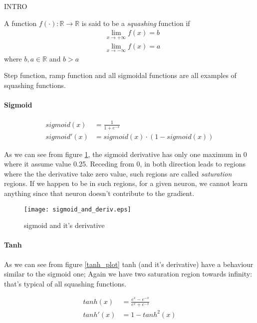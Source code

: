 INTRO

\begin{defn}
A function $f(\cdot):\mathbb{R}\rightarrow\mathbb{R}$ is said to be a \textit{squashing} function if
\begin{align}
&\lim_{x \to +\infty} f(x) = b \\
& \lim_{x \to -\infty} f(x) = a 
\end{align}
where $b,a \in \mathbb{R}$ and $b>a$
\end{defn}

Step function, ramp function and all sigmoidal functions are all examples of squashing functions.

\paragraph{Sigmoid}

\begin{align}
sigmoid(x)&= \frac{1}{1+e^{-x}}  \\ 
sigmoid'(x)&= sigmoid(x) \cdot (1-sigmoid(x))
\end{align}

As we can see from figure \ref{sigmoid_plot}, the sigmoid derivative has only one maximum in 0 where it assume value 0.25. Receding from 0, in both direction leads to regions where
the the derivative take zero value, such regions are called \textit{saturation} regions. If we happen to be in such regions, for a given neuron, we cannot learn anything since that neuron doesn't contribute
to the gradient.

\begin{figure}[h]
  \centering
    \texttt{[image: sigmoid\_and\_deriv.eps]}
  \caption{sigmoid and it's derivative}
\label{sigmoid_plot}
\end{figure}

\paragraph{Tanh}

As we can see from figure \ref{tanh_plot} tanh (and it's derivative) have a behaviour similar to the sigmoid one; Again we have two saturation region towards
infinity: that's typical of all squashing functions.

\begin{align}
 tanh(x)&=\frac{e^x-e^{-x}}{e^x+e^{-x}} \\
 tanh'(x)&= 1 - tanh^2(x)  
\end{align}

